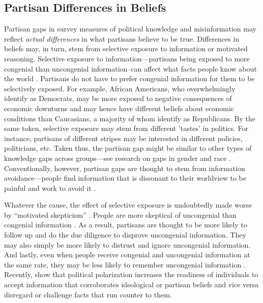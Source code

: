 \documentclass[12pt, letterpaper]{article}
\begin{document}
	\subsection*{Partisan Differences in Beliefs}
	Partisan gaps in survey measures of political knowledge and misinformation may reflect \emph{actual differences} in what partisans believe to be true. Differences in beliefs may, in turn, stem from selective exposure to information or motivated reasoning. Selective exposure to information---partisans being exposed to more congenial than uncongenial information--can affect what facts people know about the world \citep{redlawsk2002hot,stroud_2010}. Partisans do not have to prefer congenial information for them to be selectively exposed. For example, African Americans, who overwhelmingly identify as Democrats, may be more exposed to negative consequences of economic downturns and may hence have different beliefs about economic conditions than Caucasians, a majority of whom identify as Republicans. By the same token, selective exposure may stem from different 'tastes' in politics. For instance, partisans of different stripes may be interested in different policies, politicians, etc. Taken thus, the partisan gap might be similar to other types of knowledge gaps across groups---see research on gaps in gender \citep{dolan2011women, barabas2014question} and race \citep{abrajano2015reexamining}. Conventionally, however, partisan gaps are thought to stem from information avoidance---people find information that is dissonant to their worldview to be painful and work to avoid it  \citep[e.g.,][]{abelson1959modes,festinger1962theory}.
	
	Whatever the cause, the effect of selective exposure is undoubtedly made worse by ``motivated skepticism'' \citep{taber2006, stroud2008media}. People are more skeptical of uncongenial than congenial information \citep{Zaller1992}. As a result, partisans are thought to be more likely to follow up and do the due diligence to disprove uncongenial information. They may also simply be more likely to distrust and ignore uncongenial information. And lastly, even when people receive congenial and uncongenial information at the same rate, they may be less likely to remember uncongenial information \citep[see, for example][]{bayes2020and,hill2017learning,flynn2017nature, taber2006}. Recently,  \citet{peterson2021partisan} show that political polarization increases the readiness of individuals to accept information that corroborates ideological or partisan beliefs and vice versa disregard or challenge facts that run counter to them.
	
\end{document}

